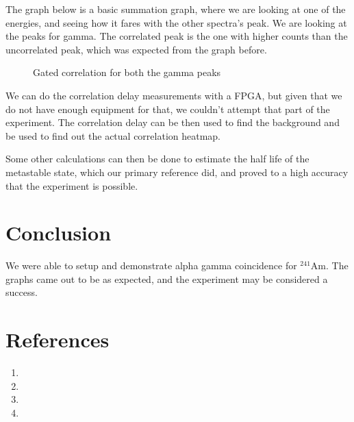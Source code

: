 \documentclass{double}
\begin{document}
\begin{multicols*}{2}
The graph below is a basic summation graph, where we are
looking at one of the energies, and seeing how it fares with
the other spectra's peak. We are looking at the peaks for
gamma. The correlated peak is the one with higher counts
than the uncorrelated peak, which was expected from the
graph before.
\begin{figure}[H]
	\centering
	\resizebox{0.8\columnwidth}{!}{%
		
	}
    \caption{Gated correlation for both the gamma peaks}
\end{figure}
We can do the correlation delay measurements with a FPGA,
but given that we do not have enough equipment for that, we
couldn't attempt that part of the experiment. The
correlation delay can be then used to find the background
and be used to find out the actual correlation heatmap.

Some other calculations can then be done to estimate the
half life of the metastable state, which our primary
reference did, and proved to a high accuracy that the
experiment is possible.

\section{Conclusion}
We were able to setup and demonstrate alpha gamma
coincidence for $^{241}$Am. The graphs came out to be as
expected, and the experiment may be considered a success.

\section{References}
\begin{enumerate}
    \item {}
    \item {}
    \item {}
    \item {}
\end{enumerate}
\end{multicols*}
\clearpage
\end{document}
